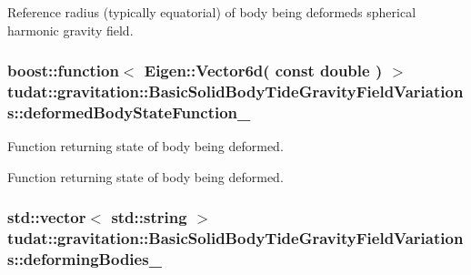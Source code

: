 Reference radius (typically equatorial) of body being deformed\textquotesingle{}s spherical harmonic gravity field. 
\subsubsection[{\texorpdfstring{deformed\+Body\+State\+Function\+\_\+}{deformedBodyStateFunction_}}]{\setlength{\rightskip}{0pt plus 5cm}boost\+::function$<$ Eigen\+::\+Vector6d( const double ) $>$ tudat\+::gravitation\+::\+Basic\+Solid\+Body\+Tide\+Gravity\+Field\+Variations\+::deformed\+Body\+State\+Function\+\_\+\hspace{0.3cm}{\ttfamily [protected]}}\hypertarget{classtudat_1_1gravitation_1_1BasicSolidBodyTideGravityFieldVariations_a5d3b0e842e58504144a2e2e2ef96c90a}{}\label{classtudat_1_1gravitation_1_1BasicSolidBodyTideGravityFieldVariations_a5d3b0e842e58504144a2e2e2ef96c90a}


Function returning state of body being deformed. 

Function returning state of body being deformed. 
\subsubsection[{\texorpdfstring{deforming\+Bodies\+\_\+}{deformingBodies_}}]{\setlength{\rightskip}{0pt plus 5cm}std\+::vector$<$ std\+::string $>$ tudat\+::gravitation\+::\+Basic\+Solid\+Body\+Tide\+Gravity\+Field\+Variations\+::deforming\+Bodies\+\_\+\hspace{0.3cm}{\ttfamily [protected]}}\hypertarget{classtudat_1_1gravitation_1_1BasicSolidBodyTideGravityFieldVariations_a6da84354b18ad22f89fa49e720dd34a9}{}\label{classtudat_1_1gravitation_1_1BasicSolidBodyTideGravityFieldVariations_a6da84354b18ad22f89fa49e720dd34a9}


